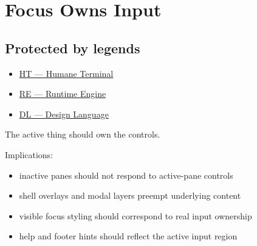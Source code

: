 \chapter{Focus Owns Input}\label{record-043}

\smallskip

\section{Protected by legends}\label{record-043-protected-by-legends}

\begin{itemize}
\tightlist
\item
  \href{https://github.com/flyingrobots/bijou/blob/1853ad902f6bf219326409e7f743a5a1d6517dbc/docs/legends/HT-humane-terminal.md}{HT --- Humane Terminal}
\item
  \href{https://github.com/flyingrobots/bijou/blob/1853ad902f6bf219326409e7f743a5a1d6517dbc/docs/legends/RE-runtime-engine.md}{RE --- Runtime Engine}
\item
  \href{https://github.com/flyingrobots/bijou/blob/1853ad902f6bf219326409e7f743a5a1d6517dbc/docs/legends/DL-design-language.md}{DL --- Design Language}
\end{itemize}

The active thing should own the controls.

Implications:

\begin{itemize}
\tightlist
\item
  inactive panes should not respond to active-pane controls
\item
  shell overlays and modal layers preempt underlying content
\item
  visible focus styling should correspond to real input ownership
\item
  help and footer hints should reflect the active input region
\end{itemize}

